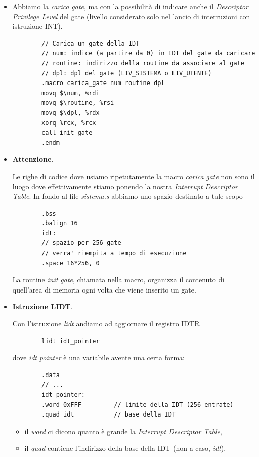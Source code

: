 \normalsize 
\begin{itemize}
	\item Abbiamo la \emph{carica$\_$gate}, ma con la possibilità di indicare anche il \emph{Descriptor Privilege Level} del gate (livello considerato solo nel lancio di interruzioni con istruzione INT). 
	\small
	\begin{verbatim}
		// Carica un gate della IDT
		// num: indice (a partire da 0) in IDT del gate da caricare
		// routine: indirizzo della routine da associare al gate
		// dpl: dpl del gate (LIV_SISTEMA o LIV_UTENTE)
		.macro carica_gate num routine dpl
		movq $\num, %rdi
		movq $\routine, %rsi
		movq $\dpl, %rdx
		xorq %rcx, %rcx
		call init_gate
		.endm
	\end{verbatim} 
	\normalsize
	\item \textbf{Attenzione}.
	
	Le righe di codice dove usiamo ripetutamente la macro \emph{carica$\_$gate} non sono il luogo dove effettivamente stiamo ponendo la nostra \emph{Interrupt Descriptor Table}. In fondo al file \emph{sistema.s} abbiamo uno spazio destinato a tale scopo
	\small
	\begin{verbatim}
		.bss
		.balign 16
		idt:
		// spazio per 256 gate
		// verra' riempita a tempo di esecuzione
		.space 16*256, 0
	\end{verbatim}
	\normalsize
	La routine \emph{init$\_$gate}, chiamata nella macro, organizza il contenuto di quell'area di memoria ogni volta che viene inserito un gate.
	
	\item \textbf{Istruzione LIDT}.
	
	Con l'istruzione \emph{lidt} andiamo ad aggiornare il registro IDTR 
	\begin{verbatim}
		lidt idt_pointer
	\end{verbatim}
	dove \emph{idt$\_$pointer} è una variabile avente una certa forma:
	\small
	\begin{verbatim}
		.data
		// ...
		idt_pointer:
		.word 0xFFF			// limite della IDT (256 entrate)
		.quad idt			// base della IDT
	\end{verbatim}
	\normalsize 
	\begin{itemize}
		\item il \emph{word} ci dicono quanto è grande la \emph{Interrupt Descriptor Table},
		\item il \emph{quad} contiene l'indirizzo della base della IDT (non a caso, \emph{idt}).
	\end{itemize}
	

\end{itemize}
